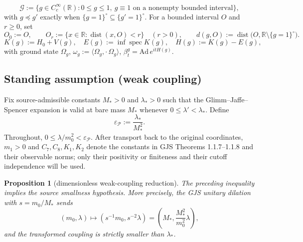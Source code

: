 \documentclass[11pt,a4paper]{article}
\theoremstyle{plain}
\newtheorem{proposition}[theorem]{Proposition}
\theoremstyle{definition}
\newcommand{\R}{\mathbb{R}}
\newcommand{\G}{\mathcal{G}}
\newcommand{\Om}{\Omega}
\newcommand{\ip}[2]{\langle #1,#2\rangle}
\DeclareMathOperator{\dist}{dist}
\DeclareMathOperator{\spec}{spec}
\begin{document}
\[
  \G:=\{g\in C_c^\infty(\R):0\le g\le1,\ g\equiv1\text{ on a nonempty bounded interval}\},
\]
with $g\preccurlyeq g'$ exactly when
$\{g=1\}^\circ\subseteq\{g'=1\}^\circ$. For a bounded interval $O$ and $r\ge0$, set
\[
 O_0:=O,\qquad O_r:=\{x\in\R:\dist(x,O)<r\}\quad(r>0),\qquad
 d(g,O):=\dist\bigl(O,\R\setminus\{g=1\}^\circ\bigr).
\]
\[
  K(g):=H_0+V(g),\quad E(g):=\inf\spec K(g),\quad H(g):=K(g)-E(g),
\]
with ground state $\Om_g$, $\omega_g:=\ip{\Om_g}{\cdot\,\Om_g}$,
$\beta^g_t=\mathrm{Ad}\,e^{itH(g)}$.

\subsection{Standing assumption (weak coupling)}

Fix source-admissible constants $M_*>0$ and $\lambda_*>0$ such that the
Glimm--Jaffe--Spencer expansion is valid at bare mass $M_*$ whenever
$0\le\lambda'<\lambda_*$. Define
\[
  \varepsilon_{\mathscr P}:=\frac{\lambda_*}{M_*^2}.
\]
Throughout, $0\le\lambda/m_0^2<\varepsilon_{\mathscr P}$. After transport back to the original
coordinates, $m_1>0$ and $C_7,C_8,K_1,K_2$ denote the constants in GJS
Theorems 1.1.7--1.1.8 and their observable norms; only their positivity or finiteness and their
cutoff independence will be used.

\begin{proposition}[dimensionless weak-coupling reduction]\label{prop:scaling}
The preceding inequality implies the source smallness hypothesis. More precisely, the GJS
unitary dilation with $s=m_0/M_*$ sends
\[
  (m_0,\lambda)\longmapsto
  (s^{-1}m_0,s^{-2}\lambda)
  =\left(M_*,\frac{M_*^2}{m_0^2}\lambda\right),
\]
and the transformed coupling is strictly smaller than $\lambda_*$.
\end{proposition}
\end{document}
